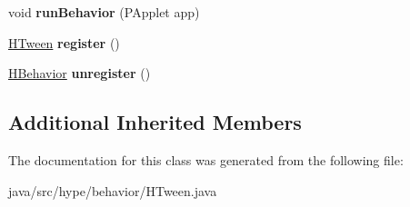 \begin{DoxyCompactItemize}
\item 
\hypertarget{classhype_1_1behavior_1_1_h_tween_ac12d69a33663b6c1ece91571cacfbefa}{void {\bfseries run\-Behavior} (P\-Applet app)}\label{classhype_1_1behavior_1_1_h_tween_ac12d69a33663b6c1ece91571cacfbefa}

\item 
\hypertarget{classhype_1_1behavior_1_1_h_tween_acc1ec1b56ea2daf3188308a1029e31f6}{\hyperlink{classhype_1_1behavior_1_1_h_tween}{H\-Tween} {\bfseries register} ()}\label{classhype_1_1behavior_1_1_h_tween_acc1ec1b56ea2daf3188308a1029e31f6}

\item 
\hypertarget{classhype_1_1behavior_1_1_h_tween_a3ad9f4805d56e94f4b1b4b56efb1fbab}{\hyperlink{classhype_1_1behavior_1_1_h_behavior}{H\-Behavior} {\bfseries unregister} ()}\label{classhype_1_1behavior_1_1_h_tween_a3ad9f4805d56e94f4b1b4b56efb1fbab}

\end{DoxyCompactItemize}
\subsection*{Additional Inherited Members}


The documentation for this class was generated from the following file\-:\begin{DoxyCompactItemize}
\item 
java/src/hype/behavior/H\-Tween.\-java\end{DoxyCompactItemize}
